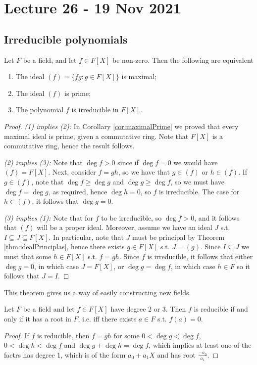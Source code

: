 \section{Lecture 26 - 19 Nov 2021}
\subsection{Irreducible polynomials}
\begin{theorem}
  Let $F$ be a field, and let $f\in F[X]$ be non-zero. Then the following are equivalent
  \begin{enumerate}
    \item The ideal $(f)=\{fg:g\in F[X]\}$ is maximal;
    \item The ideal $(f)$ is prime;
    \item The polynomial $f$ is irreducible in $F[X]$.
  \end{enumerate}
  \label{<+label+>}
\end{theorem}
\begin{proof}
  \emph{(1) implies (2):} In Corollary \ref{cor:maximalPrime} we proved that every maximal
  ideal is prime, given a commutative ring. Note that $F[X]$ is a commutative ring, hence
  the result follows.

  \emph{(2) implies (3):} Note that $\deg f>0$ since if $\deg f=0$ we would have
  $(f)=F[X]$. Next, consider $f=gh$, so we have that $g\in (f)$ or $h\in (f)$.  If $g\in
  (f)$, note that $\deg f \geq\deg g$ and $\deg g \geq \deg f$, so we must have $\deg
  f= \deg g$, as required, hence $\deg h=0$, so $f$ is irreducible. The case for $h\in
  (f)$, it follows that $\deg g=0$.

  \emph{(3) implies (1):} Note that for $f$ to be irreducible, so $\deg f>0$, and it
  follows that $(f)$ will be a proper ideal. Moreover, assume we have an ideal $J$ s.t.
  $I\subseteq J \subseteq F[X]$. In particular, note that $J$ must be principal by Theorem
  \ref{thm:idealPrinciplas}, hence there exists $g\in F[X]$ s.t. $J=(g)$. Since
  $I\subseteq J$ we must that some $h\in F[X]$ s.t. $f=gh$. Since $f$ is irreducible, it
  follows that either $\deg g=0$, in which case $J=F[X]$, or $\deg g=\deg f$, in which
  case $h\in F$ so it follows that $J=I$.
\end{proof}
This theorem gives us a way of easily constructing new fields.
\begin{theorem}
  Let $F$ be a field and let $f\in F[X]$ have degree 2 or 3. Then $f$ is reducible if and
  only if it has a root in $F$, i.e. iff there exists $a\in F$ s.t. $f(a)=0$.
  \label{thm:deg2o3Root}
\end{theorem}
\begin{proof}
  If $f$ is reducible, then $f=gh$ for some $0<\deg g<\deg f$, $0<\deg h<\deg f$ and
  $\deg g + \deg h = \deg f$, which implies at least one of the factrs has degree 1,
  which is of the form $a_0+a_1X$ and has root $\frac{-a_0}{a_1}$.
\end{proof}

